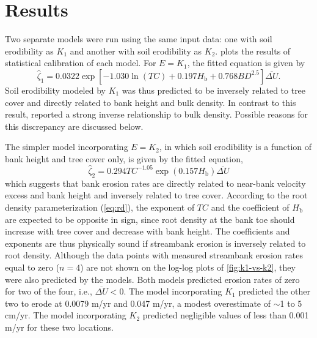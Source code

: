 \documentclass[preprint, review, authoryear, 12pt]{elsarticle}
\begin{document}
\section{Results}

Two separate models were run using the same input data: one with soil erodibility as $K_1$ and another with soil erodibility as $K_2$.  plots the results of statistical calibration of each model. For $E=K_1$, the fitted equation is given by
\begin{equation}\label{eq:k1res}
\hat{\zeta}_{1} = 0.0322 \exp\left[-1.030 \ln(\mathit{TC}) + 0.197 H_\text{b} + 0.768 \mathit{BD}^{2.5} \right]\overline{\Delta U}.
\end{equation}
Soil erodibility modeled by $K_1$ was thus predicted to be inversely related to tree cover and directly related to bank height and bulk density. In contrast to this result, \citet{Wynn2006} reported a strong inverse relationship to bulk density. Possible reasons for this discrepancy are discussed below. 

The simpler model incorporating $E=K_2$, in which soil erodibility is a function of bank height and tree cover only, is given by the fitted equation,
\begin{equation}\label{eq:k2res}
\hat{\zeta}_{2} = 0.294 \mathit{TC}^{-1.05}\exp(0.157 H_\text{b}) \overline{\Delta U}
\end{equation}
which suggests that bank erosion rates are directly related to near-bank velocity excess and bank height and inversely related to tree cover. According to the root density parameterization (\cref{eq:rd}), the exponent of $TC$ and the coefficient of $H_\text{b}$ are expected to be opposite in sign, since root density at the bank toe should increase with tree cover and decrease with bank height. The coefficients and exponents are thus physically sound if streambank erosion is inversely related to root density. Although the data points with measured streambank erosion rates equal to zero ($n=4$) are not shown on the log-log plots of \cref{fig:k1-vs-k2}, they were also predicted by the models. Both models predicted erosion rates of zero for two of the four, i.e., $\overline{\Delta U} < 0$. The model incorporating $K_1$ predicted the other two to erode at 0.0079 m/yr and 0.047 m/yr, a modest overestimate of $\sim$1 to 5 cm/yr. The model incorporating $K_2$ predicted negligible values of less than 0.001 m/yr for these two locations.
\end{document}

